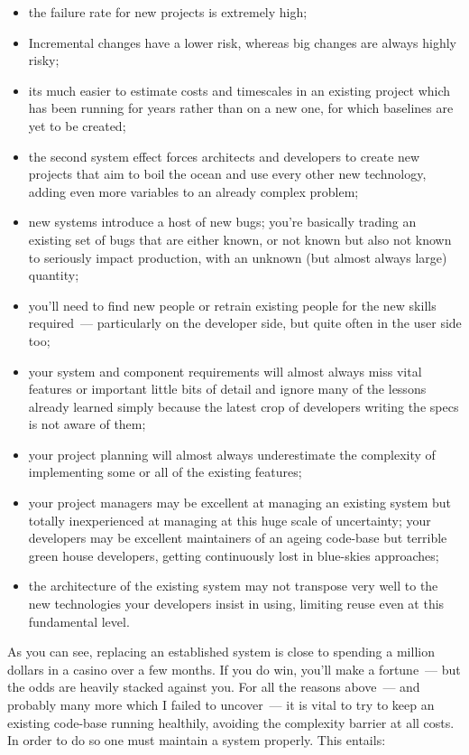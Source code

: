 \documentclass{book}
\begin{document}
\begin{itemize}
\item the failure rate for new projects is extremely high;
\item Incremental changes have a lower risk, whereas big changes are
  always highly risky;
\item its much easier to estimate costs and timescales in an existing
  project which has been running for years rather than on a new one,
  for which baselines are yet to be created;
\item the second system effect forces architects and developers to
  create new projects that aim to boil the ocean and use every other
  new technology, adding even more variables to an already complex
  problem;
\item new systems introduce a host of new bugs; you're basically
  trading an existing set of bugs that are either known, or not known
  but also not known to seriously impact production, with an unknown
  (but almost always large) quantity;
\item you'll need to find new people or retrain existing people for the
  new skills required~--- particularly on the developer side, but quite
  often in the user side too;
\item your system and component requirements will almost always miss
  vital features or important little bits of detail and ignore many of
  the lessons already learned simply because the latest crop of
  developers writing the specs is not aware of them;
\item your project planning will almost always underestimate the
  complexity of implementing some or all of the existing features;
\item your project managers may be excellent at managing an existing
  system but totally inexperienced at managing at this huge scale of
  uncertainty; your developers may be excellent maintainers of an
  ageing code-base but terrible green house developers, getting
  continuously lost in blue-skies approaches;
\item the architecture of the existing system may not transpose very
  well to the new technologies your developers insist in using,
  limiting reuse even at this fundamental level.
\end{itemize}

As you can see, replacing an established system is close to spending a
million dollars in a casino over a few months. If you do win, you'll
make a fortune~--- but the odds are heavily stacked against you. For all
the reasons above~--- and probably many more which I failed to uncover~---
it is vital to try to keep an existing code-base running healthily,
avoiding the complexity barrier at all costs. In order to do so one
must maintain a system properly. This entails:
\end{document}
